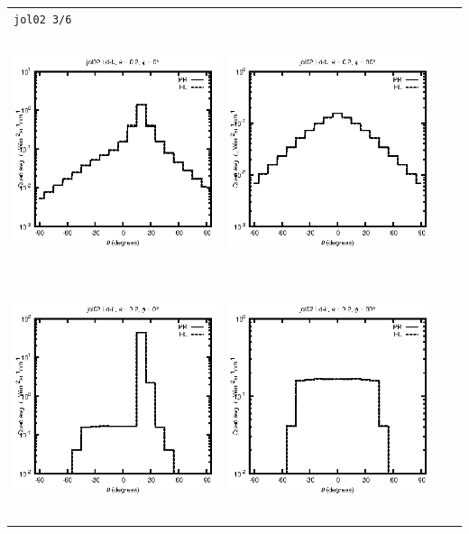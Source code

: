 \begin{tabular}{c c c c}
\multicolumn{4}{l}{\texttt{jol02 3/6}} \\
\includegraphics[height=7cm]{../eps/jol02_Ld_b_fwd.eps} &
\includegraphics[height=7cm]{../eps/jol02_Ld_b_cross.eps} \\
\includegraphics[height=7cm]{../eps/jol02_Ld_it_fwd.eps} &
\includegraphics[height=7cm]{../eps/jol02_Ld_it_cross.eps} \\

\end{tabular}
